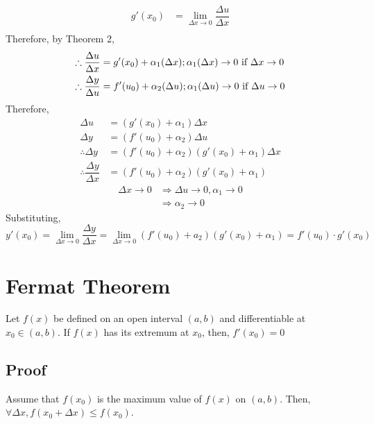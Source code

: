 \documentclass[fleqn]{article}
\begin{document}
\begin{align*}
	g'(x_0) &= \lim\limits_{\Delta x \rightarrow 0} \dfrac{\Delta u}{\Delta x} \\
\end{align*}
Therefore, by Theorem 2, 
\begin{align*}
	\therefore \dfrac{\Delta u}{\Delta x} &= g'(x_0) + \alpha_1(\Delta x) \hfill ; \alpha_1(\Delta x) \rightarrow 0 \text{ if } \Delta x \rightarrow 0 \\
	\therefore \dfrac{\Delta y}{\Delta u} &= f'(u_0) + \alpha_2(\Delta u) \hfill ; \alpha_1(\Delta u) \rightarrow 0 \text{ if } \Delta u \rightarrow 0
\end{align*}
Therefore, 
\begin{align*}
	\Delta u &= (g'(x_0) + \alpha_1) \Delta x \\
	\Delta y &= (f'(u_0) + \alpha_2) \Delta u \\
	\therefore \Delta y &= (f'(u_0) + \alpha_2)(g'(x_0) + \alpha_1) \Delta x \\
	\therefore \dfrac{\Delta y}{\Delta x} &= (f'(u_0) + \alpha_2) (g'(x_0) + \alpha_1) 
\end{align*}
\begin{align*}
	\Delta x \rightarrow 0 &\Rightarrow \Delta u \rightarrow 0 , \alpha_1 \rightarrow 0 \\
	&\Rightarrow \alpha_2 \rightarrow 0
\end{align*}
Substituting,
\begin{equation*}
	y'(x_0) = \lim\limits_{\Delta x \rightarrow 0} \dfrac{\Delta y}{\Delta x} = \lim\limits_{\Delta x \rightarrow 0} \left(f'(u_0) + a_2\right) \left(g'(x_0) + \alpha_1\right) = f'(u_0) \cdot g'(x_0)
\end{equation*}

\section{Fermat Theorem} \label{Fermat Theorem}

Let $f(x)$ be defined on an open interval $(a, b)$ and differentiable at $x_0 \in (a,b)$. If $f(x)$ has its extremum at $x_0$, then, $f'(x_0) = 0$

\subsection{Proof}

Assume that $f(x_0)$ is the maximum value of $f(x)$ on $(a, b)$. Then, $\forall \Delta x, f(x_0 + \Delta x) \leq f(x_0)$.
\end{document}
